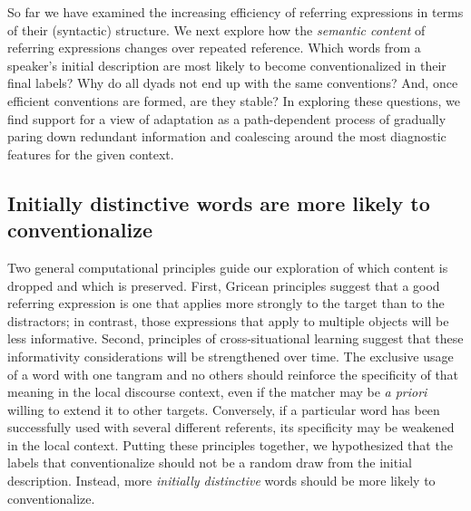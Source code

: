 \documentclass[alpha-refs]{wiley-article}
\begin{document}
So far we have examined the increasing efficiency of referring expressions in terms of their (syntactic) structure.
We next explore how the \emph{semantic content} of referring expressions changes over repeated reference.
Which words from a speaker's initial description are most likely to become conventionalized in their final labels?
Why do all dyads not end up with the same conventions? And,
once efficient conventions are formed, are they stable?
In exploring these questions, we find support for a view of adaptation as a path-dependent process of gradually paring down redundant information and coalescing around the most diagnostic features for the given context.

\subsection{Initially distinctive words are more likely to conventionalize}
\label{sec:distinctive}

Two general computational principles guide our exploration of which content is dropped and which is preserved.
First, Gricean principles suggest that a good referring expression is one that applies more strongly to the target than to the distractors; in contrast, those expressions that apply to multiple objects will be less informative.
Second, principles of cross-situational learning suggest that these informativity considerations will be strengthened over time.
The exclusive usage of a word with one tangram and no others should reinforce the specificity of that meaning in the local discourse context, even if the matcher may be \emph{a priori} willing to extend it to other targets.
Conversely, if a particular word has been successfully used with several different referents, its specificity may be weakened in the local context.
Putting these principles together, we hypothesized that the labels that conventionalize should not be a random draw from the initial description.
Instead, more \emph{initially distinctive} words should be more likely to conventionalize.
\end{document}
